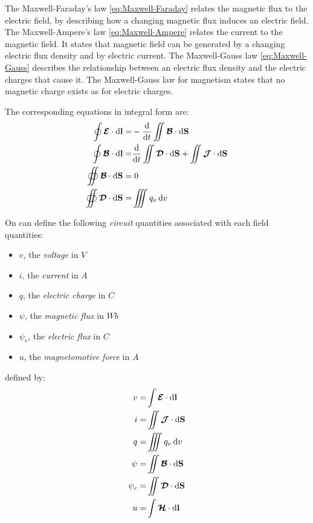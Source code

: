 The Maxwell-Faraday's law \ref{eq:Maxwell-Faraday} relates the magnetic flux to the electric field, by describing how a changing magnetic flux induces an electric field.
The Maxwell-Ampere's law \ref{eq:Maxwell-Ampere} relates the current to the magnetic field. It states that magnetic field can be generated by a changing electric flux density and by electric current. 
The Maxwell-Gauss law \ref{eq:Maxwell-Gauss} describes the relationship between an electric flux density and the electric charges that cause it. 
The Maxwell-Gauss law for magnetism states that no magnetic charge exists as for electric charges.

The corresponding equations in integral form are:
\begin{subequations}
	\begin{align}
	\oint \boldsymbol{\mathcal{E}} \cdot \diff \mathbf{l} 
	=&
		- \frac{\diff }{\diff t} \iint \boldsymbol{\mathcal{B}} \cdot \diff \mathbf{S} 
		\\
		\oint \boldsymbol{\mathcal{B}} \cdot \diff \mathbf{l} 
		=&
		\frac{\diff }{\diff t} \iint \boldsymbol{\mathcal{D}} \cdot \diff \mathbf{S} 	
		+ \iint \boldsymbol{\mathcal{J}} \cdot \diff \mathbf{S} 
		\\
		\oiint \boldsymbol{\mathcal{B}} \cdot \diff \mathbf{S} 
		=& \; 0
		\\
		\oiint \boldsymbol{\mathcal{D}} \cdot \diff \mathbf{S} 
		=& 
		\iiint q_v \diff v			
	\end{align}
	\label{eq:MaxwellEquationsIntegral}
\end{subequations}

On can define the following \emph{circuit} quantities associated with each field quantities\parencite{Harrington2001}:
\begin{itemize}
	\item $v$, the \emph{voltage} in $V$
	\item $i$, the \emph{current} in $A$
	\item $q$, the \emph{electric charge} in $C$
	\item $\psi$, the \emph{magnetic flux} in $Wb$
	\item $\psi_e$, the \emph{electric flux} in $C$
	\item $u$, the \emph{magnetomotive force} in $A$
\end{itemize}
defined by:
\begin{subequations}
	\begin{align}
	v =& \int \boldsymbol{\mathcal{E}} \cdot \mathop{}\!\mathrm{d} \mathbf{l} \\
	i =& \iint \boldsymbol{\mathcal{J}} \cdot \mathop{}\!\mathrm{d} \mathbf{S} \\
	q =& \iiint q_v \mathop{}\!\mathrm{d} v \\
	\psi =& \iint \boldsymbol{\mathcal{B}} \cdot \mathop{}\!\mathrm{d} \mathbf{S} \\
	\psi_e=& \iint \boldsymbol{\mathcal{D}} \cdot \mathop{}\!\mathrm{d} \mathbf{S} \\
	u =& \int \boldsymbol{\mathcal{H}} \cdot \mathop{}\!\mathrm{d} \mathbf{l}
	\end{align}
	\label{eq:CircuitQuantities}
\end{subequations}



